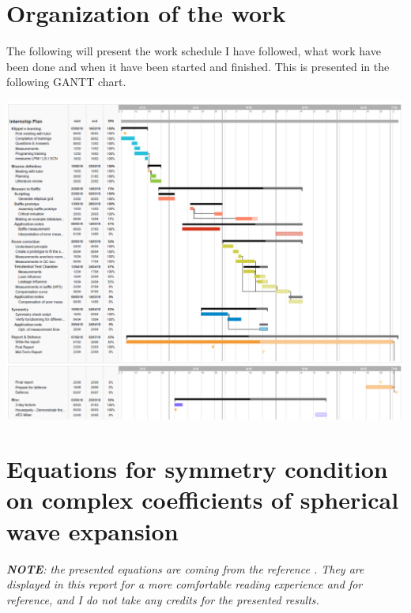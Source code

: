 \documentclass{report}
\begin{document}
\begin{appendices}

\chapter{Organization of the work}

The following will present the work schedule I have followed, what work have been done and when it have been started and finished. This is presented in the following GANTT chart.

\begin{center}
	\includegraphics[width=\textwidth]{Appendix/Plan1} 
\end{center}

\chapter{Equations for symmetry condition on complex coefficients of spherical wave expansion}
\label{chap:sym}

\textit{\textbf{NOTE}: the presented equations are coming from the reference \cite{aeshs}. They are displayed in this report for a more comfortable reading experience and for reference, and I do not take any credits for the presented results.} \\


\end{appendices}
\end{document}
